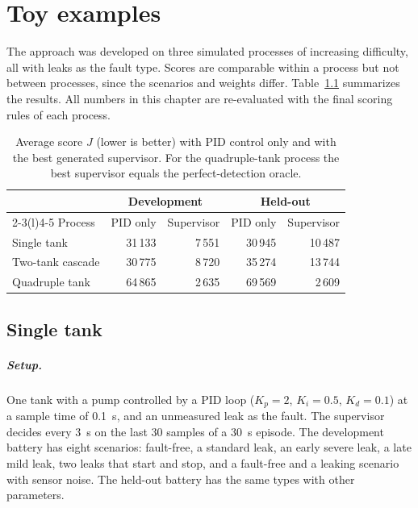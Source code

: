\chapter{Toy examples}
\label{ch:toy}
The approach was developed on three simulated processes of increasing
difficulty, all with leaks as the fault type. Scores are comparable within a
process but not between processes, since the scenarios and weights differ.
Table~\ref{tab:summary} summarizes the results. All numbers in this chapter
are re-evaluated with the final scoring rules of each process.

\begin{table}[tb]
  \centering
  \caption{Average score $J$ (lower is better) with PID control only and with
    the best generated supervisor. For the quadruple-tank process the best
    supervisor equals the perfect-detection oracle.}
  \label{tab:summary}
  \begin{tabular}{@{}lrrrr@{}}
    \toprule
    & \multicolumn{2}{c}{Development} & \multicolumn{2}{c}{Held-out} \\
    \cmidrule(lr){2-3}\cmidrule(l){4-5}
    Process & PID only & Supervisor & PID only & Supervisor \\
    \midrule
    Single tank      & 31\,133 & 7\,551 & 30\,945 & 10\,487 \\
    Two-tank cascade & 30\,775 & 8\,720 & 35\,274 & 13\,744 \\
    Quadruple tank   & 64\,865 & 2\,635 & 69\,569 &  2\,609 \\
    \bottomrule
  \end{tabular}
\end{table}

\section{Single tank}
\label{sec:single}
\paragraph{Setup.} One tank with a pump controlled by a PID loop
($K_p = 2$, $K_i = 0.5$, $K_d = 0.1$) at a sample time of 0.1~s, and an
unmeasured leak as the fault. The supervisor decides every 3~s on the last
30 samples of a 30~s episode. The development battery has eight scenarios:
fault-free, a standard leak, an early severe leak, a late mild leak, two
leaks that start and stop, and a fault-free and a leaking scenario with
sensor noise. The held-out battery has the same types with other parameters.

